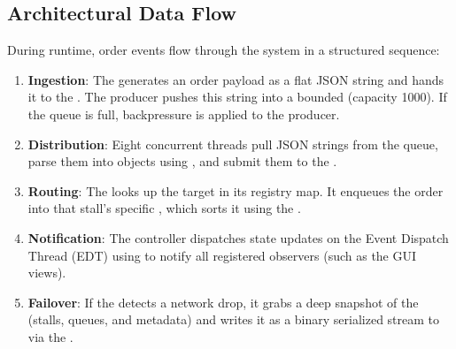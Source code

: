 \subsection{Architectural Data Flow}
During runtime, order events flow through the system in a structured sequence:
\begin{enumerate}
    \item \textbf{Ingestion}: The  generates an order payload as a flat JSON string and hands it to the . The producer pushes this string into a bounded  (capacity 1000). If the queue is full, backpressure is applied to the producer.
    \item \textbf{Distribution}: Eight concurrent  threads pull JSON strings from the queue, parse them into  objects using , and submit them to the .
    \item \textbf{Routing}: The  looks up the target  in its registry map. It enqueues the order into that stall's specific , which sorts it using the .
    \item \textbf{Notification}: The controller dispatches state updates on the Event Dispatch Thread (EDT) using  to notify all registered observers (such as the GUI views).
    \item \textbf{Failover}: If the  detects a network drop, it grabs a deep snapshot of the  (stalls, queues, and metadata) and writes it as a binary serialized stream to  via the .
\end{enumerate}

